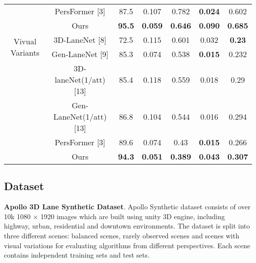 \begin{table*}[ht]
\begin{tabular}{ccccccc}
        \multirow{2}{*}{ }               & PersFormer [3] & 87.5 & 0.107 & 0.782 & \textbf{0.024} & 0.602 \\
        \multirow{2}{*}{ }               & Ours       & \textbf{95.5} & \textbf{0.059} & \textbf{0.646} & \textbf{0.090} & \textbf{0.685} \\
        \midrule %
        \multirow{2}{*}{Vivual Variants} & 3D-LaneNet [8] & 72.5 & 0.115 & 0.601 & 0.032 & \textbf{0.23}  \\
        \multirow{2}{*}{ }               & Gen-LaneNet [9] & 85.3 & 0.074 & 0.538 & \textbf{0.015} & 0.232  \\
        \multirow{2}{*}{ }               & 3D-laneNet(1/att) [13] & 85.4 & 0.118 & 0.559 & 0.018 & 0.29  \\
        \multirow{2}{*}{ }               & Gen-LaneNet(1/att) [13] & 86.8 & 0.104 & 0.544 & 0.016 & 0.294  \\
        \multirow{2}{*}{ }               & PersFormer [3] & 89.6 & 0.074 & 0.43  & \textbf{0.015} & 0.266 \\
        \multirow{2}{*}{ }               & Ours       & \textbf{94.3} &\textbf{ 0.051} & \textbf{0.389} & \textbf{0.043} & \textbf{0.307} \\
        \bottomrule %
    \end{tabular}
\end{table*}

\subsection{Dataset}
\label{subsec:Dataset}

\textbf {Apollo 3D Lane Synthetic Dataset}. Apollo Synthetic
dataset \cite{guo2020gen} consists of over 10k 1080 × 1920 images which
are built using unity 3D engine, including highway, urban,
residential and downtown environments. The dataset is split
into three different scenes: balanced scenes, rarely observed
scenes and scenes with visual variations for evaluating algorithms from different perspectives.
Each scene contains independent training sets and test sets.


